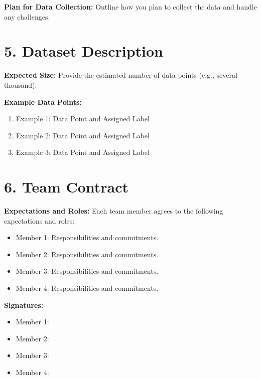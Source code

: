 \documentclass{article}
\begin{document}
\textbf{Plan for Data Collection:} Outline how you plan to collect the data and handle any challenges.

\section*{5. Dataset Description}
\textbf{Expected Size:} Provide the estimated number of data points (e.g., several thousand).

\textbf{Example Data Points:}
\begin{enumerate}
    \item Example 1: Data Point and Assigned Label
    \item Example 2: Data Point and Assigned Label
    \item Example 3: Data Point and Assigned Label
\end{enumerate}

\section*{6. Team Contract}
\textbf{Expectations and Roles:}  
Each team member agrees to the following expectations and roles:
\begin{itemize}
    \item Member 1: Responsibilities and commitments.
    \item Member 2: Responsibilities and commitments.
    \item Member 3: Responsibilities and commitments.
    \item Member 4: Responsibilities and commitments.
\end{itemize}

\textbf{Signatures:}
\begin{itemize}
    \item Member 1: \underline{\hspace{6cm}}
    \item Member 2: \underline{\hspace{6cm}}
    \item Member 3: \underline{\hspace{6cm}}
    \item Member 4: \underline{\hspace{6cm}}
\end{itemize}
\end{document}
